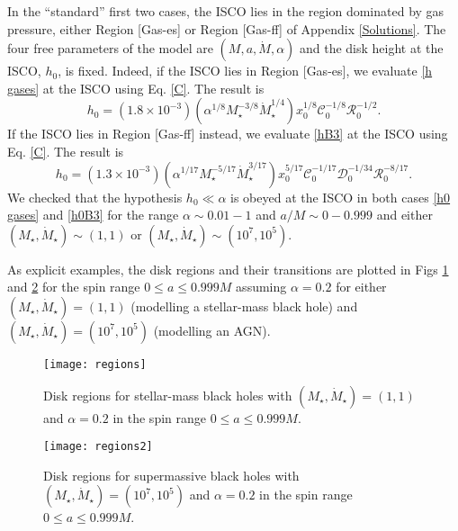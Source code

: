 \documentclass[a4paper,fleqn,usenatbib]{mnrasMOD}
\numberwithin{equation}{section}
\newcommand{\be}{\begin{equation}}
\newcommand{\ee}{\end{equation}}
\begin{document}
In the ``standard'' first two cases, the ISCO lies in the region dominated by gas pressure, either Region [Gas-es] or Region [Gas-ff] of Appendix \ref{Solutions}. The four free parameters of the model are $(M,a,\dot M,\alpha)$ and the disk height at the ISCO, $h_0$, is fixed. Indeed, if the ISCO lies in Region [Gas-es], we evaluate \eqref{h gases} at the ISCO using Eq. \eqref{C}. The result is 
\be \label{h0 gases}
h_0 = \left(1.8 \times 10^{-3}\right)\left( \alpha^{1/8} M_{\star}^{-3/8} \dot{M}_{\star}^{1/4}\right) x_0^{1/8}\mathcal{C}_0^{-1/8}\mathcal{R}_0^{-1/2}.
\ee
If the ISCO lies in Region [Gas-ff] instead, we evaluate \eqref{hB3} at the ISCO using Eq. \eqref{C}. The result is 
\be \label{h0B3}
h_0 = \left(1.3 \times 10^{-3}\right)\left( \alpha^{1/17} M_{\star}^{-5/17} \dot{M}_{\star}^{3/17}\right) x_0^{5/17}\mathcal{C}_0^{-1/17}\mathcal{D}_0^{-1/34}\mathcal{R}_0^{-8/17}.
\ee
We checked that the hypothesis $h_0 \ll \alpha$ is obeyed at the ISCO in both cases \eqref{h0 gases} and \eqref{h0B3} for the range $\alpha \sim 0.01-1$ and $a/M \sim 0 - 0.999$ and either $(M_{\star},\dot{M}_\star)\sim (1, 1)$ or $(M_{\star},\dot{M}_\star)\sim (10^{7}, 10^{5})$.

As explicit examples, the disk regions and their transitions are plotted in Figs \ref{regions} and \ref{regions2} for the spin range $0 \leq a \leq 0.999 M$ assuming $\alpha = 0.2$ for either $(M_{\star},\dot{M}_\star)=(1, 1)$ (modelling a stellar-mass black hole) and $(M_{\star},\dot{M}_\star)= (10^{7}, 10^{5})$ (modelling an AGN).  




\begin{figure}
\centering
\texttt{[image: regions]}
\caption{Disk regions for stellar-mass black holes with $(M_{\star},\dot{M}_\star)= (1, 1)$ and $\alpha = 0.2$ in the spin range $0 \leq a \leq 0.999 M$.}
\label{regions}
\end{figure}


\begin{figure}
\centering
\texttt{[image: regions2]}
\caption{Disk regions for supermassive black holes with $(M_{\star},\dot{M}_\star)= (10^{7}, 10^{5})$ and $\alpha = 0.2$ in the spin range $0 \leq a \leq 0.999 M$.}
\label{regions2}
\end{figure}
\end{document}
